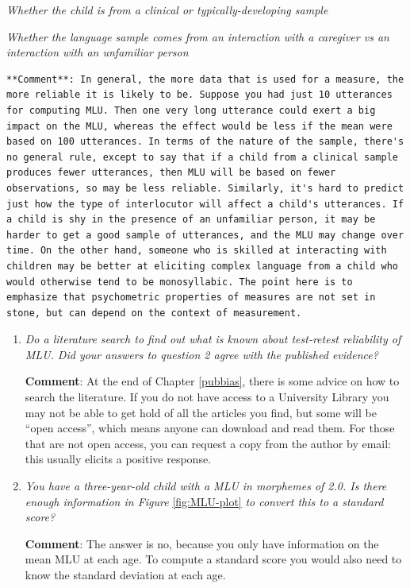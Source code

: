 \documentclass{krantz}
\begin{document}
\emph{Whether the child is from a clinical or typically-developing sample}

\emph{Whether the language sample comes from an interaction with a caregiver vs an interaction with an unfamiliar person}

\begin{verbatim}
**Comment**: In general, the more data that is used for a measure, the more reliable it is likely to be. Suppose you had just 10 utterances for computing MLU. Then one very long utterance could exert a big impact on the MLU, whereas the effect would be less if the mean were based on 100 utterances. In terms of the nature of the sample, there's no general rule, except to say that if a child from a clinical sample produces fewer utterances, then MLU will be based on fewer observations, so may be less reliable. Similarly, it's hard to predict just how the type of interlocutor will affect a child's utterances. If a child is shy in the presence of an unfamiliar person, it may be harder to get a good sample of utterances, and the MLU may change over time. On the other hand, someone who is skilled at interacting with children may be better at eliciting complex language from a child who would otherwise tend to be monosyllabic. The point here is to emphasize that psychometric properties of measures are not set in stone, but can depend on the context of measurement.
\end{verbatim}

\begin{enumerate}
\def\labelenumi{\arabic{enumi}.}
\setcounter{enumi}{2}
\item
  \emph{Do a literature search to find out what is known about test-retest reliability of MLU. Did your answers to question 2 agree with the published evidence?}

  \textbf{Comment}: At the end of Chapter \ref{pubbias}, there is some advice on how to search the literature. If you do not have access to a University Library you may not be able to get hold of all the articles you find, but some will be ``open access'', which means anyone can download and read them. For those that are not open access, you can request a copy from the author by email: this usually elicits a positive response.
\item
  \emph{You have a three-year-old child with a MLU in morphemes of 2.0. Is there enough information in Figure} \ref{fig:MLU-plot} \emph{to convert this to a standard score?}

  \textbf{Comment}: The answer is no, because you only have information on the mean MLU at each age. To compute a standard score you would also need to know the standard deviation at each age.
\end{enumerate}
\end{document}
